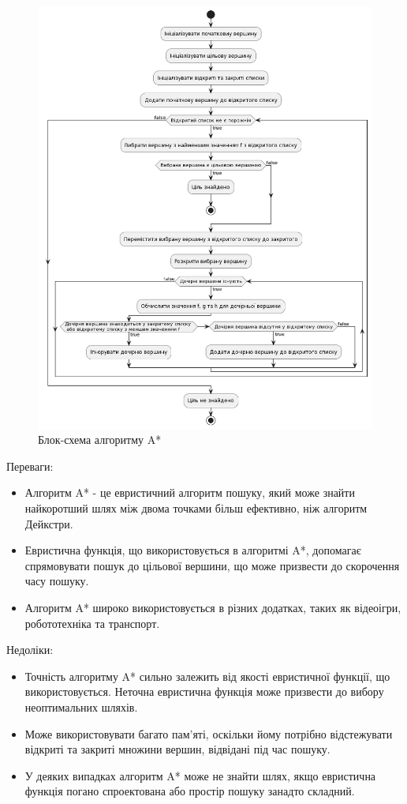 \begin{figure}[!htp]
    \centering
    \includegraphics[scale=0.5]{content/chapters/2-implementation-methods/assets/img/a_star_algorithm.png}
    \caption{Блок-схема алгоритму A*}
    \label{fig:a-star}
\end{figure}

Переваги:
\begin{itemize}
    \item Алгоритм A* - це евристичний алгоритм пошуку, який може знайти найкоротший шлях між двома точками більш ефективно, ніж алгоритм Дейкстри.
    \item Евристична функція, що використовується в алгоритмі A*, допомагає спрямовувати пошук до цільової вершини, що може призвести до скорочення часу пошуку.
    \item Алгоритм A* широко використовується в різних додатках, таких як відеоігри, робототехніка та транспорт.
\end{itemize}

Недоліки:
\begin{itemize}
    \item  Точність алгоритму A* сильно залежить від якості евристичної функції, що використовується. Неточна евристична функція може призвести до вибору неоптимальних шляхів.
    \item Може використовувати багато пам'яті, оскільки йому потрібно відстежувати відкриті та закриті множини вершин, відвідані під час пошуку.
    \item У деяких випадках алгоритм A* може не знайти шлях, якщо евристична функція погано спроектована або простір пошуку занадто складний.
\end{itemize}
